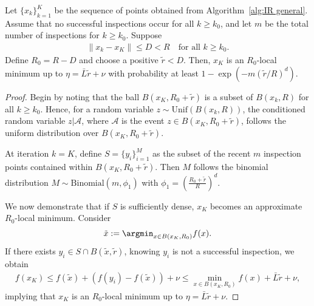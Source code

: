 \begin{theorem} \label{thm: high prob guarantee of an approx. R-local min}
    Let $\{x_k\}_{k=1}^{K}$ be the sequence of points obtained from Algorithm~\ref{alg:IR general}. Assume that no successful inspections occur for all $k \geq k_0$, and let $m$ be the total number of inspections for $k \geq k_0$. Suppose
    \begin{align*}
        \|x_{k} - x_K\| \leq D < R \quad \text{for all } k \geq k_0.
    \end{align*}
    Define $R_0 = R-D$ and choose a positive $\tilde{r} < D$. Then, $x_K$ is an $R_0$-local minimum up to $\eta = \bar{L}\tilde{r} + \nu$ with probability at least $1-\exp(- m (\tilde{r}/R)^d)$.
\end{theorem}
\begin{proof}
    Begin by noting that the ball $B(x_K, R_0 + \tilde{r})$ is a subset of $B(x_{k}, R)$ for all $k \geq k_0$. Hence, for a random variable $z \sim \mathrm{Unif}(B(x_{k}, R))$, the conditioned random variable $z|\mathcal{A}$, where $\mathcal{A}$ is the event $z \in B(x_K, R_0 + \tilde{r})$, follows the uniform distribution over $B(x_K, R_0 + \tilde{r})$.

    At iteration $k= K$, define $S = \{y_i\}_{i=1}^{M}$ as the subset of the recent $m$ inspection points contained within $B(x_K, R_0 + \tilde{r})$. Then $M$ follows the binomial distribution $M \sim \mathrm{Binomial}( m , \phi_1)$ with $\phi_1 = \left(\frac{R_0  + \tilde{r}}{R}\right)^d$.
    
    We now demonstrate that if $S$ is sufficiently dense, $x_K$ becomes an approximate $R_0$-local minimum. Consider
    \begin{align*}
        \tilde{x} := \argmin_{x \in B(x_K, R_0)} f(x).
    \end{align*}
    If there exists $y_i \in S \cap B(\tilde{x},\tilde{r})$, knowing $y_i$ is not a successful inspection, we obtain 
    \begin{align*}
        f(x_K) \leq f(\tilde{x}) + (f(y_i) - f(\tilde{x})) + \nu
        \leq \min_{x \in B(x_K, R_0)}f(x) + \bar{L} \tilde{r} + \nu,
    \end{align*}
    implying that $x_K$ is an $R_0$-local minimum up to $\eta = \bar{L}\tilde{r} + \nu$.
    

\end{proof}
